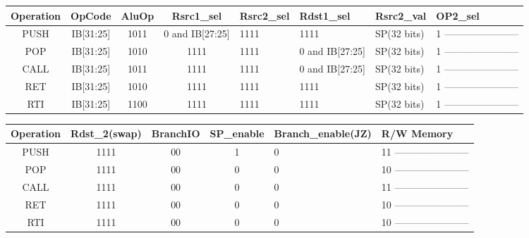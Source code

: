 \documentclass[12pt]{report}
\begin{document}
\begin{itemize}
        \begin{center}
        \begin{tabular}{||c| c| c| c| p{40mm}||} 
        \hline
        Operation & OpCode & AluOp & Rsrc1_sel & Rsrc2_sel & Rdst1_sel & Rsrc2_val & OP2_sel  \\ [0.5ex] 
        \hline\hline
        PUSH & IB[31:25] & 1011 & 0 and IB[27:25] & 1111 & 1111 & SP(32 bits) & 1 ----------------------- \\
        \hline
        POP & IB[31:25] & 1010 & 1111 & 1111 & 0 and IB[27:25] & SP(32 bits) & 1 ----------------------- \\
        \hline
        CALL & IB[31:25] & 1011 & 1111 & 1111 & 0 and IB[27:25] & SP(32 bits) & 1 ----------------------- \\
        \hline
        RET & IB[31:25] & 1010 & 1111 & 1111 & 1111 & SP(32 bits) & 1 ----------------------- \\
        \hline
        RTI & IB[31:25] & 1100 & 1111 & 1111 & 1111 & SP(32 bits) & 1 ----------------------- \\
        \hline
        \end{tabular}
        \end{center}

        \begin{center}
        \begin{tabular}{||c| c| c| c| p{40mm}||} 
        \hline
        Operation & Rdst_2(swap) & BranchIO & SP_enable & Branch_enable(JZ) & R/W Memory  \\ [0.5ex] 
        \hline\hline
        PUSH & 1111 & 00 & 1 & 0 & 11 ----------------------- \\
        \hline
        POP & 1111 & 00 & 0 & 0 & 10 ----------------------- \\
        \hline
        CALL & 1111 & 00 & 0 & 0 & 11 ----------------------- \\
        \hline
        RET & 1111 & 00 & 0 & 0 & 10 ----------------------- \\
        \hline
        RTI & 1111 & 00 & 0 & 0 & 10 ----------------------- \\
        \hline
        \end{tabular}
        \end{center}



\end{itemize}
\end{document}
